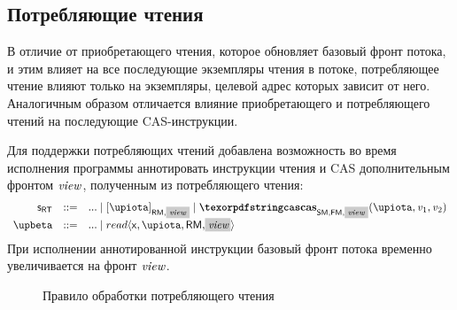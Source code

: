 \subsection{Потребляющие чтения}
В отличие от приобретающего чтения, которое обновляет базовый фронт потока,
и этим влияет на все последующие экземпляры чтения в потоке,
потребляющее чтение влияют только на экземпляры,
целевой адрес которых зависит от него.
Аналогичным образом отличается влияние приобретающего и потребляющего чтений
на последующие CAS-инструкции.

Для поддержки потребляющих чтений добавлена возможность
во время исполнения программы аннотировать инструкции чтения и
CAS дополнительным фронтом $\stSigma$, полученным из потребляющего чтения:
%
\[\begin{array}{rcl}
\RT & ::= & ... \mid [\locVar]_{\RM,\text{\colorbox{\grayhighlightcolor}{\ensuremath{\stSigma}}}} \mid %
             \CasF{\SM}{\FM}{\locVar}{\mvalSubst_{1}}{\mvalSubst_{2}}{\text{\colorbox{\grayhighlightcolor}{\ensuremath{\stSigma}}}}
\\
\stPostOp & ::= & ... \mid read\angled{\vName, \locVar, \RM, \graybox{\stSigma}}
\end{array}\]
%
При исполнении аннотированной инструкции базовый фронт потока временно
увеличивается на фронт $\stSigma$.

\begin{figure}

\begin{mathpar}
\end{mathpar}
\caption{Правило обработки потребляющего чтения}
\label{fig:readcon}
\end{figure}


